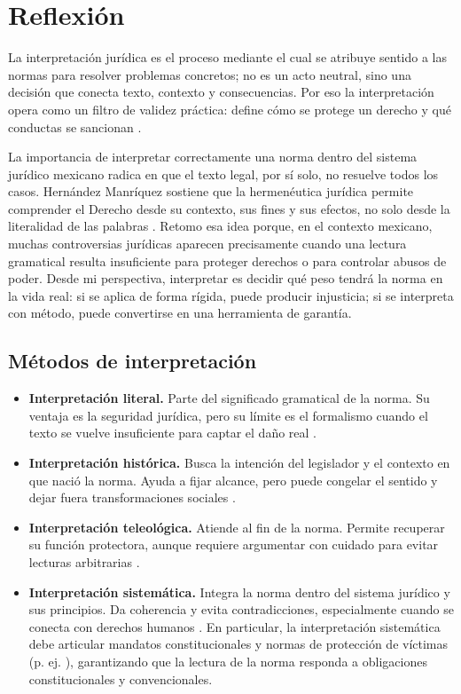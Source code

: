\documentclass[
	spanish,
	letterpaper, oneside
]{article}
\begin{document}
\section{Reflexión}

La interpretación jurídica es el proceso mediante el cual se atribuye sentido a las normas para resolver problemas concretos; no es un acto neutral, sino una decisión que conecta texto, contexto y consecuencias. Por eso la interpretación opera como un filtro de validez práctica: define cómo se protege un derecho y qué conductas se sancionan \citep{hernandezManriquezHermeneutica2019}.

La importancia de interpretar correctamente una norma dentro del sistema jurídico mexicano radica en que el texto legal, por sí solo, no resuelve todos los casos. Hernández Manríquez sostiene que la hermenéutica jurídica permite comprender el Derecho desde su contexto, sus fines y sus efectos, no solo desde la literalidad de las palabras \citep{hernandezManriquezHermeneutica2019}. Retomo esa idea porque, en el contexto mexicano, muchas controversias jurídicas aparecen precisamente cuando una lectura gramatical resulta insuficiente para proteger derechos o para controlar abusos de poder. Desde mi perspectiva, interpretar es decidir qué peso tendrá la norma en la vida real: si se aplica de forma rígida, puede producir injusticia; si se interpreta con método, puede convertirse en una herramienta de garantía.

\subsection{Métodos de interpretación}

\begin{itemize}
	\item \textbf{Interpretación literal.} Parte del significado gramatical de la norma. Su ventaja es la seguridad jurídica, pero su límite es el formalismo cuando el texto se vuelve insuficiente para captar el daño real \citep{scjnMemoriaArgumentacion2008}.
	\item \textbf{Interpretación histórica.} Busca la intención del legislador y el contexto en que nació la norma. Ayuda a fijar alcance, pero puede congelar el sentido y dejar fuera transformaciones sociales \citep{hernandezManriquezHermeneutica2019}.
	\item \textbf{Interpretación teleológica.} Atiende al fin de la norma. Permite recuperar su función protectora, aunque requiere argumentar con cuidado para evitar lecturas arbitrarias \citep{scjnMemoriaArgumentacion2008}.
	\item \textbf{Interpretación sistemática.} Integra la norma dentro del sistema jurídico y sus principios. Da coherencia y evita contradicciones, especialmente cuando se conecta con derechos humanos \citep{scjnIncapacidadResistencia2019,scjnViolenciaFisica2022}. En particular, la interpretación sistemática debe articular mandatos constitucionales y normas de protección de víctimas (p. ej. \citep{cpeum2026,LeyGeneralVictimas}), garantizando que la lectura de la norma responda a obligaciones constitucionales y convencionales.
\end{itemize}
\end{document}
